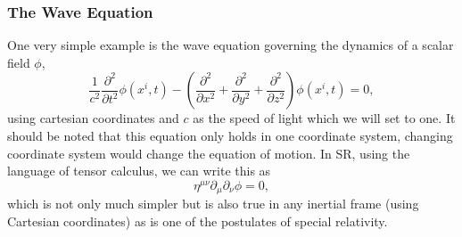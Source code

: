 \subsubsection{The Wave Equation}
One very simple example is the wave equation governing the dynamics of a scalar field $\phi$, 
\begin{equation}
\frac{1}{c^2}\frac{\partial^2}{\partial t^2} \phi(x^i,t) - \left(\frac{\partial^2}{\partial x^2}+\frac{\partial^2}{\partial y^2}+\frac{\partial^2}{\partial z^2} \right)\phi(x^i,t)=0,
\end{equation}
using cartesian coordinates and $c$ as the speed of light which we will set to one. It should be noted that this equation only holds in one coordinate system, changing coordinate system would change the equation of motion. In SR, using the language of tensor calculus, we can write this as 
\begin{equation}
\eta^{\mu\nu}\partial_\mu\partial_\nu\phi=0\label{intro:eq:waveeqn},
\end{equation}
which is not only much simpler but is also true in any inertial frame (using Cartesian coordinates) as is one of the postulates of special relativity.

